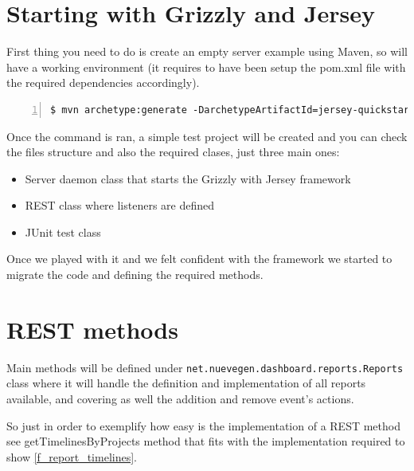 \section{Starting with Grizzly and Jersey}
First thing you need to do is create an empty server example using Maven, so
will have a working environment (it requires to have been setup the pom.xml
file with the required dependencies accordingly).\\

\begin{lstlisting}[language=Shell,breaklines=true,caption=Grizzly\ and\ Jersey\
First\ setup,label=f_setup_grizzlyjersey,frame=single,captionpos=b,numbers=left] 
$ mvn archetype:generate -DarchetypeArtifactId=jersey-quickstart-grizzly2 -DarchetypeGroupId=org.glassfish.jersey.archetypes -DinteractiveMode=false -DgroupId=net.nuevegen.dashboard -DartifactId=dashboard -Dpackage=net.nuevegen.dashboard 
\end{lstlisting}

Once the command is ran, a simple test project will be created and you can check
the files structure and also the required clases, just three main ones:
\begin{itemize}
  \item Server daemon class that starts the Grizzly with Jersey framework
  \item REST class where listeners are defined
  \item JUnit test class
\end{itemize}

Once we played with it and we felt confident with the framework we started
to migrate the code and defining the required methods.

\section{REST methods}
Main methods will be defined under
\texttt{net.nuevegen.dashboard.reports.Reports} class where it will handle
the definition and implementation of all reports available, and covering as well
the addition and remove event's actions. 

So just in order to exemplify how easy is the implementation of a REST method
see getTimelinesByProjects method that fits with the implementation required to
show \ref{f_report_timelines}.\\

